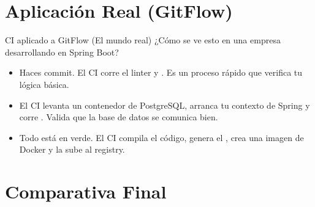 \documentclass[aspectratio=169]{beamer}
\begin{document}
\section{Aplicación Real (GitFlow)}

\begin{frame}{CI aplicado a GitFlow (El mundo real)}
    ¿Cómo se ve esto en una empresa desarrollando en Spring Boot?
    
    \vspace{0.4cm}
    \begin{itemize}
        \item {} Haces commit. El CI corre el linter y . Es un proceso rápido que verifica tu lógica básica.
        \item {} El CI levanta un contenedor de PostgreSQL, arranca tu contexto de Spring y corre . Valida que la base de datos se comunica bien.
        \item {} Todo está en verde. El CI compila el código, genera el , crea una imagen de Docker y la sube al registry.
    \end{itemize}
\end{frame}

\section{Comparativa Final}
\end{document}
